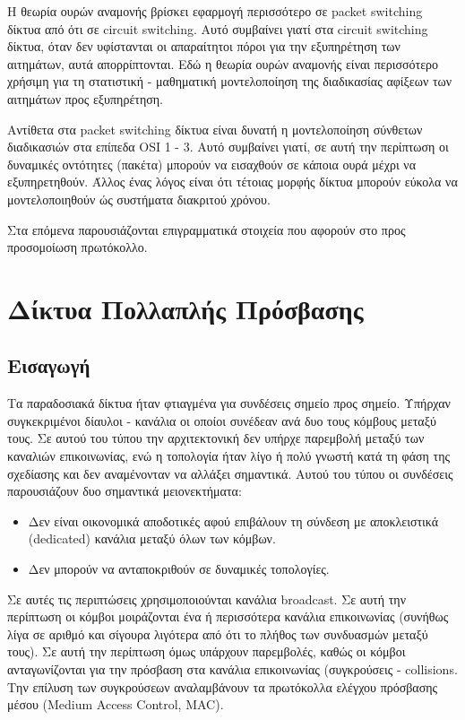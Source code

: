 \documentclass[12pt]{report}
\begin{document}
Η θεωρία ουρών αναμονής βρίσκει εφαρμογή περισσότερο σε \textlatin{packet switching} δίκτυα από ότι σε \textlatin{circuit switching}. Αυτό συμβαίνει γιατί στα \textlatin{circuit switching} δίκτυα, όταν δεν υφίστανται οι απαραίτητοι πόροι για την εξυπηρέτηση των αιτημάτων, αυτά απορρίπτονται. Εδώ η θεωρία ουρών αναμονής είναι περισσότερο χρήσιμη για τη στατιστική - μαθηματική μοντελοποίηση της διαδικασίας αφίξεων των αιτημάτων προς εξυπηρέτηση.

Αντίθετα στα \textlatin{packet switching} δίκτυα είναι δυνατή η μοντελοποίηση σύνθετων διαδικασιών στα επίπεδα \textlatin{OSI 1 - 3}. Αυτό συμβαίνει γιατί, σε αυτή την περίπτωση οι δυναμικές οντότητες (πακέτα) μπορούν να εισαχθούν σε κάποια ουρά μέχρι να εξυπηρετηθούν. Άλλος ένας λόγος είναι ότι τέτοιας μορφής δίκτυα μπορούν εύκολα να μοντελοποιηθούν ώς συστήματα διακριτού χρόνου.

Στα επόμενα παρουσιάζονται επιγραμματικά στοιχεία που αφορούν στο προς προσομοίωση πρωτόκολλο.

\section{Δίκτυα Πολλαπλής Πρόσβασης}
\subsection{Εισαγωγή}
Τα παραδοσιακά δίκτυα ήταν φτιαγμένα για συνδέσεις σημείο προς σημείο. Υπήρχαν συγκεκριμένοι δίαυλοι - κανάλια οι οποίοι συνέδεαν ανά δυο τους κόμβους μεταξύ τους. Σε αυτού του τύπου την αρχιτεκτονική δεν υπήρχε παρεμβολή μεταξύ των καναλιών επικοινωνίας, ενώ η τοπολογία ήταν λίγο ή πολύ γνωστή κατά τη φάση της σχεδίασης και δεν αναμένονταν να αλλάξει σημαντικά. Αυτού του τύπου οι συνδέσεις παρουσιάζουν δυο σημαντικά μειονεκτήματα:

\begin{itemize}
  \item Δεν είναι οικονομικά αποδοτικές αφού επιβάλουν τη σύνδεση με αποκλειστικά (\textlatin{dedicated}) κανάλια μεταξύ όλων των κόμβων.
  \item Δεν μπορούν να ανταποκριθούν σε δυναμικές τοπολογίες.
\end{itemize}

Σε αυτές τις περιπτώσεις χρησιμοποιούνται κανάλια \textlatin{broadcast}. Σε αυτή την περίπτωση οι κόμβοι μοιράζονται ένα ή περισσότερα κανάλια επικοινωνίας (συνήθως λίγα σε αριθμό και σίγουρα λιγότερα από ότι το πλήθος των συνδυασμών μεταξύ τους). Σε αυτή την περίπτωση όμως υπάρχουν παρεμβολές, καθώς οι κόμβοι ανταγωνίζονται για την πρόσβαση στα κανάλια επικοινωνίας (συγκρούσεις - \textlatin{collisions}. Την επίλυση των συγκρούσεων αναλαμβάνουν τα πρωτόκολλα ελέγχου πρόσβασης μέσου (\textlatin{Medium Access Control, MAC}).
\end{document}
